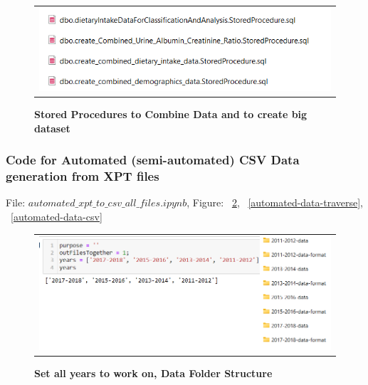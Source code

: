 \begin{figure}[!htb]
\begin{tabular}{c}
\includegraphics[scale=1]{images/datasetgenerationcode/create-data-set.png} \\
\end{tabular}
\caption{\textbf{Stored Procedures to Combine Data and to create big dataset}}
\label{sp-combine}
\vspace{0.25cm}
\end{figure}

\subsubsection{Code for Automated (semi-automated) CSV Data generation from XPT files}
File: $automated\_xpt\_to\_csv\_all\_files.ipynb$, Figure: ~\ref{automated-data-year}, ~\ref{automated-data-traverse}, ~\ref{automated-data-csv}

\begin{figure}[!htb]
\begin{tabular}{c}
\includegraphics[scale=1]{images/datasetgenerationcode/set-years.png} \\
\end{tabular}
\caption{\textbf{Set all years to work on, Data Folder Structure}}
\label{automated-data-year}
\vspace{0.25cm}
\end{figure}

